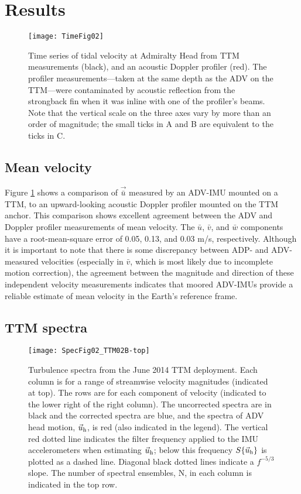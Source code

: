 \section{Results}
\label{sec:results}

\begin{figure}[t]
  \centering
  \texttt{[image: TimeFig02]}
  \caption{Time series of tidal velocity at Admiralty Head from TTM measurements (black), and an acoustic Doppler profiler (red). The profiler measurements---taken at the same depth as the ADV on the TTM---were contaminated by acoustic reflection from the strongback fin when it was inline with one of the profiler's beams. Note that the vertical scale on the three axes vary by more than an order of magnitude; the small ticks in A and B are equivalent to the ticks in C.}
  \label{fig:vel_time}
\end{figure}

\subsection{Mean velocity}

Figure \ref{fig:vel_time} shows a comparison of $\vec{\bar u}$ measured by an ADV-IMU mounted on a TTM, to an upward-looking acoustic Doppler profiler mounted on the TTM anchor. This comparison shows excellent agreement between the ADV and Doppler profiler measurements of mean velocity. The $\bar u$, $\bar v$, and $\bar w$ components have a root-mean-square error of 0.05, 0.13, and 0.03 m/s, respectively. Although it is important to note that there is some discrepancy between ADP- and ADV-measured velocities (especially in $\bar v$, which is most likely due to incomplete motion correction), the agreement between the magnitude and direction of these independent velocity measurements indicates that moored ADV-IMUs provide a reliable estimate of mean velocity in the Earth's reference frame.

\subsection{TTM spectra}

\begin{figure*}[t]
  \centering
  \texttt{[image: SpecFig02\_TTM02B-top]}
  \caption{Turbulence spectra from the June 2014 TTM deployment. Each column is for a range of streamwise velocity magnitudes (indicated at top). The rows are for each component of velocity (indicated to the lower right of the right column). The uncorrected spectra are in black and the corrected spectra are blue, and the spectra of ADV head motion, $\vec{u}_\mathrm{h}$, is red (also indicated in the legend). The vertical red dotted line indicates the filter frequency applied to the IMU accelerometers when estimating $\vec{u}_\mathrm{h}$; below this frequency $S\{\vec{u}_\mathrm{h}\}$ is plotted as a dashed line.   Diagonal black dotted lines indicate a $f^{-5/3}$ slope. The number of spectral ensembles, N, in each column is indicated in the top row.}
  \label{fig:spec:ttm}
\end{figure*}

